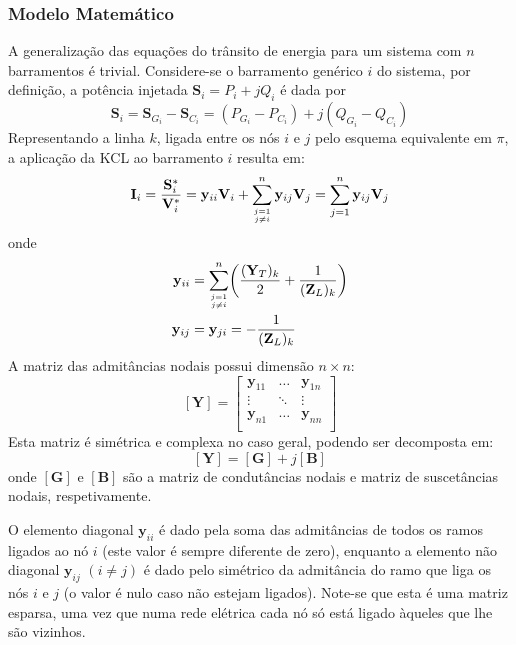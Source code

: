 \subsubsection{Modelo Matemático}

A generalização das equações do trânsito de energia para um sistema com $n$ barramentos é trivial. Considere-se o barramento genérico $i$ do sistema, por definição, a potência injetada $\mathbf{S}_i = P_i + jQ_i$ é dada por
$$
    \mathbf{S}_i = \mathbf{S}_{G_i} - \mathbf{S}_{C_i} = (P_{G_i} - P_{C_i}) + j(Q_{G_i} - Q_{C_i})
$$
Representando a linha $k$, ligada entre os nós $i$ e $j$ pelo esquema equivalente em $\pi$, a aplicação da KCL ao barramento $i$ resulta em:
$$
    \mathbf{I}_i = \frac{\mathbf{S}^{*}_i}{\mathbf{V}^{*}_i} = \mathbf{y}_{ii} \mathbf{V}_i + \sum_{{j = 1}\atop{j \neq i}}^{n} \mathbf{y}_{ij} \mathbf{V}_j = \sum_{j = 1}^{n} \mathbf{y}_{ij} \mathbf{V}_j
$$
onde 
$$
    \begin{aligned}
        \mathbf{y}_{ii} &= \sum_{{j = 1}\atop{j \neq i}}^{n} \left( \frac{(\mathbf{Y}_T)_k}{2} + \frac{1}{(\mathbf{Z}_L)_k} \right)  \\
        \mathbf{y}_{ij} &= \mathbf{y}_{ji} = -\frac{1}{(\mathbf{Z}_L)_k}
    \end{aligned}
$$
A matriz das admitâncias nodais possui dimensão $n \times n$:
$$
    [\mathbf{Y}] =
    \begin{bmatrix}
        \mathbf{y}_{11} & \dots & \mathbf{y}_{1n} \\
        \vdots & \ddots & \vdots \\
        \mathbf{y}_{n1} & \dots & \mathbf{y}_{nn} \\
    \end{bmatrix}
$$
Esta matriz é simétrica e complexa no caso geral, podendo ser decomposta em:
$$
    [\mathbf{Y}] = [\mathbf{G}] + j[\mathbf{B}]
$$
onde $[\mathbf{G}]$ e $[\mathbf{B}]$ são a matriz de condutâncias nodais e matriz de suscetâncias nodais, respetivamente.

O elemento diagonal $\mathbf{y}_{ii}$ é dado pela soma das admitâncias de todos os ramos ligados ao nó $i$ (este valor é sempre diferente de zero), enquanto a elemento não diagonal $\mathbf{y}_{ij}$ $(i \neq j)$ é dado pelo simétrico da admitância do ramo que liga os nós $i$ e $j$ (o valor é nulo caso não estejam ligados). Note-se que esta é uma matriz esparsa, uma vez que numa rede elétrica cada nó só está ligado àqueles que lhe são vizinhos.

